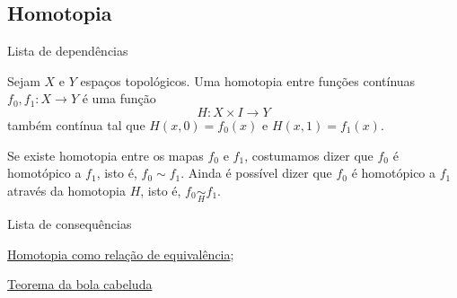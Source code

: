 \subsection{Homotopia}
\label{homotopia-def}
\begin{titlemize}{Lista de dependências}
\end{titlemize}
\begin{defi}[Homotopia]
	Sejam $X$ e $Y$ espaços topológicos. Uma homotopia entre funções contínuas $f_0, f_1: X\rightarrow Y$ é uma função $$H:X\times I\rightarrow Y$$ também contínua tal que $H(x,0)=f_0(x)$ e $H(x,1)=f_1(x)$.
\end{defi}

Se existe homotopia entre os mapas $f_0$ e $f_1$, costumamos dizer que $f_0$ é homotópico a $f_1$, isto é, $f_0\sim f_1$. Ainda é possível dizer que $f_0$ é homotópico a $f_1$ através da homotopia $H$, isto é, $f_0 \underset{H}{\sim} f_1$.

\begin{titlemize}{Lista de consequências}
	\item \hyperref[homotopia-relaçao-de-equivalencia]{Homotopia como relação de equivalência};\\ %
	\item \hyperref[homotopia-teorema-da-bola-cabeluda]{Teorema da bola cabeluda}
\end{titlemize}

